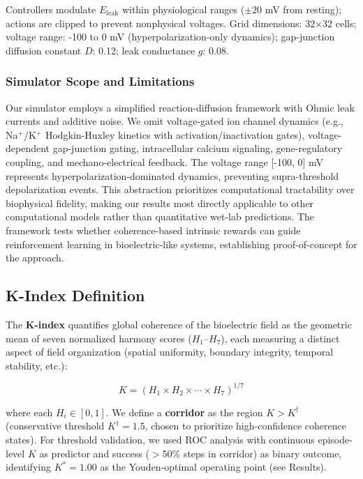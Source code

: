 \documentclass[10pt,letterpaper]{article}
\begin{document}
Controllers modulate $E_{\text{leak}}$ within physiological ranges ($\pm 20$ mV from resting); actions are clipped to prevent nonphysical voltages. Grid dimensions: 32×32 cells; voltage range: -100 to 0 mV (hyperpolarization-only dynamics); gap-junction diffusion constant $D$: 0.12; leak conductance $g$: 0.08.

\subsubsection*{Simulator Scope and Limitations}

Our simulator employs a simplified reaction-diffusion framework with Ohmic leak currents and additive noise. We omit voltage-gated ion channel dynamics (e.g., Na$^+$/K$^+$ Hodgkin-Huxley kinetics with activation/inactivation gates), voltage-dependent gap-junction gating, intracellular calcium signaling, gene-regulatory coupling, and mechano-electrical feedback. The voltage range [-100, 0] mV represents hyperpolarization-dominated dynamics, preventing supra-threshold depolarization events. This abstraction prioritizes computational tractability over biophysical fidelity, making our results most directly applicable to other computational models rather than quantitative wet-lab predictions. The framework tests whether coherence-based intrinsic rewards can guide reinforcement learning in bioelectric-like systems, establishing proof-of-concept for the approach.

\subsection*{K-Index Definition}

The \textbf{K-index} quantifies global coherence of the bioelectric field as the geometric mean of seven normalized harmony scores ($H_1$–$H_7$), each measuring a distinct aspect of field organization (spatial uniformity, boundary integrity, temporal stability, etc.):

\begin{equation}
K = (H_1 \times H_2 \times \cdots \times H_7)^{1/7}
\end{equation}

where each $H_i \in [0, 1]$. We define a \textbf{corridor} as the region $K > K^\dagger$ (conservative threshold $K^\dagger = 1.5$, chosen to prioritize high-confidence coherence states). For threshold validation, we used ROC analysis with continuous episode-level $K$ as predictor and success ($>$50\% steps in corridor) as binary outcome, identifying $K^* = 1.00$ as the Youden-optimal operating point (see Results).
\end{document}
